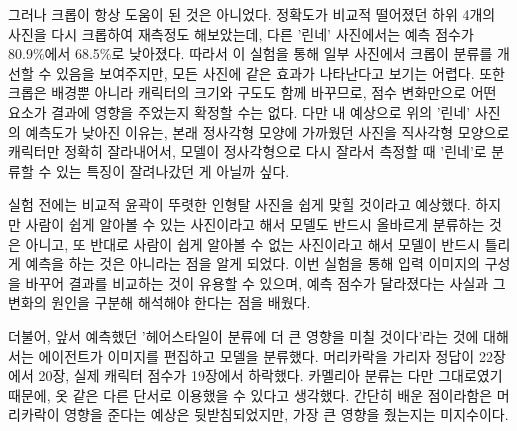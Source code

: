 \documentclass[11pt]{article}
\begin{document}
그러나 크롭이 항상 도움이 된 것은 아니었다. 정확도가 비교적 떨어졌던 하위 4개의 사진을 다시 크롭하여 재측정도 해보았는데, 다른 '린네' 사진에서는 예측 점수가 80.9\%에서 68.5\%로 낮아졌다. 따라서 이 실험을 통해 일부 사진에서 크롭이 분류를 개선할 수 있음을 보여주지만, 모든 사진에 같은 효과가 나타난다고 보기는 어렵다. 또한 크롭은 배경뿐 아니라 캐릭터의 크기와 구도도 함께 바꾸므로, 점수 변화만으로 어떤 요소가 결과에 영향을 주었는지 확정할 수는 없다. 다만 내 예상으로 위의 '린네' 사진의 예측도가 낮아진 이유는, 본래 정사각형 모양에 가까웠던 사진을 직사각형 모양으로 캐릭터만 정확히 잘라내어서, 모델이 정사각형으로 다시 잘라서 측정할 때 '린네'로 분류할 수 있는 특징이 잘려나갔던 게 아닐까 싶다.

실험 전에는 비교적 윤곽이 뚜렷한 인형탈 사진을 쉽게 맞힐 것이라고 예상했다. 하지만 사람이 쉽게 알아볼 수 있는 사진이라고 해서 모델도 반드시 올바르게 분류하는 것은 아니고, 또 반대로 사람이 쉽게 알아볼 수 없는 사진이라고 해서 모델이 반드시 틀리게 예측을 하는 것은 아니라는 점을 알게 되었다. 이번 실험을 통해 입력 이미지의 구성을 바꾸어 결과를 비교하는 것이 유용할 수 있으며, 예측 점수가 달라졌다는 사실과 그 변화의 원인을 구분해 해석해야 한다는 점을 배웠다.

더불어, 앞서 예측했던 '헤어스타일이 분류에 더 큰 영향을 미칠 것이다'라는 것에 대해서는 에이전트가 이미지를 편집하고 모델을 분류했다. 머리카락을 가리자 정답이 22장에서 20장, 실제 캐릭터 점수가 19장에서 하락했다. 카멜리아 분류는 다만 그대로였기 때문에, 옷 같은 다른 단서로 이용했을 수 있다고 생각했다. 간단히 배운 점이라함은 머리카락이 영향을 준다는 예상은 뒷받침되었지만, 가장 큰 영향을 줬는지는 미지수이다.

\figurepages


\end{document}
